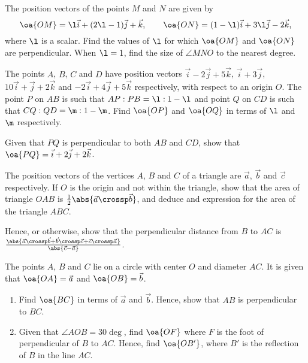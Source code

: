\begin{problem}
    The position vectors of the points $M$ and $N$ are given by \[\oa{OM} = \l \vec i + (2\l - 1) \vec j + \vec k, \qquad \oa{ON} = (1-\l) \vec i + 3\l \vec j - 2 \vec k,\] where $\l$ is a scalar. Find the values of $\l$ for which $\oa{OM}$ and $\oa{ON}$ are perpendicular. When $\l = 1$, find the size of $\angle MNO$ to the nearest degree.
\end{problem}

\begin{problem}
    The points $A$, $B$, $C$ and $D$ have position vectors $\vec i - 2\vec j + 5\vec k$, $\vec i + 3\vec j$, $10\vec i + \vec j + 2\vec k$ and $-2\vec i + 4\vec j + 5\vec k$ respectively, with respect to an origin $O$. The point $P$ on $AB$ is such that $AP : PB = \l : 1 - \l$ and point $Q$ on $CD$ is such that $CQ : QD = \m : 1 - \m$. Find $\oa{OP}$ and $\oa{OQ}$ in terms of $\l$ and $\m$ respectively.

    Given that $PQ$ is perpendicular to both $AB$ and $CD$, show that $\oa{PQ} = \vec i + 2\vec j + 2\vec k$.
\end{problem}

\begin{problem}
    The position vectors of the vertices $A$, $B$ and $C$ of a triangle are $\vec a$, $\vec b$ and $\vec c$ respectively. If $O$ is the origin and not within the triangle, show that the area of triangle $OAB$ is $\frac12 \abs{\vec a \crossp \vec b}$, and deduce and expression for the area of the triangle $ABC$.

    Hence, or otherwise, show that the perpendicular distance from $B$ to $AC$ is $\frac{\abs{\vec a \crossp \vec b + \vec b \crossp \vec c + \vec c \crossp \vec a}}{\abs{\vec c - \vec a}}$.
\end{problem}

\begin{problem}[C]
    The points $A$, $B$ and $C$ lie on a circle with center $O$ and diameter $AC$. It is given that $\oa{OA} = \vec a$ and $\oa{OB} = \vec b$.

    \begin{enumerate}
        \item Find $\oa{BC}$ in terms of $\vec a$ and $\vec b$. Hence, show that $AB$ is perpendicular to $BC$.
        \item Given that $\angle AOB = 30\deg$, find $\oa{OF}$ where $F$ is the foot of perpendicular of $B$ to $AC$. Hence, find $\oa{OB'}$, where $B'$ is the reflection of $B$ in the line $AC$.
    \end{enumerate}
\end{problem}